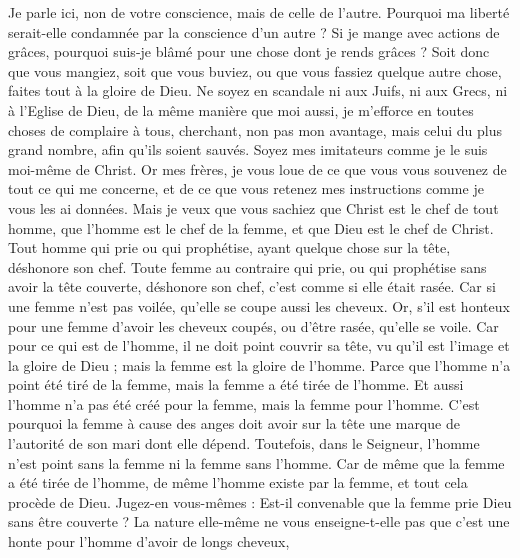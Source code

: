 \begin{multicols}{2}
Je parle ici, non de votre conscience, mais de celle de l'autre. Pourquoi ma liberté serait-elle condamnée par la conscience d'un autre ?
Si je mange avec actions de grâces, pourquoi suis-je blâmé pour une chose dont je rends grâces ?
Soit donc que vous mangiez, soit que vous buviez, ou que vous fassiez quelque autre chose, faites tout à la gloire de Dieu.
Ne soyez en scandale ni aux Juifs, ni aux Grecs, ni à l'Eglise de Dieu,
de la même manière que moi aussi, je m’efforce en toutes choses de complaire à tous, cherchant, non pas mon avantage, mais celui du plus grand nombre, afin qu’ils soient sauvés.
\VerseOne{}Soyez mes imitateurs comme je le suis moi-même de Christ.
Or mes frères, je vous loue de ce que vous vous souvenez de tout ce qui me concerne, et de ce que vous retenez mes instructions comme je vous les ai données.
Mais je veux que vous sachiez que Christ est le chef de tout homme, que l’homme est le chef de la femme, et que Dieu est le chef de Christ.
Tout homme qui prie ou qui prophétise, ayant quelque chose sur la tête, déshonore son chef.
Toute femme au contraire qui prie, ou qui prophétise sans avoir la tête couverte, déshonore son chef, c'est comme si elle était rasée.
Car si une femme n'est pas voilée, qu’elle se coupe aussi les cheveux. Or, s'il est honteux pour une femme d'avoir les cheveux coupés, ou d'être rasée, qu'elle se voile.
Car pour ce qui est de l'homme, il ne doit point couvrir sa tête, vu qu'il est l'image et la gloire de Dieu ; mais la femme est la gloire de l'homme.
Parce que l'homme n'a point été tiré de la femme, mais la femme a été tirée de l'homme.
Et aussi l'homme n'a pas été créé pour la femme, mais la femme pour l'homme.
C'est pourquoi la femme à cause des anges doit avoir sur la tête une marque de l’autorité de son mari dont elle dépend.
Toutefois, dans le Seigneur, l'homme n'est point sans la femme ni la femme sans l'homme.
Car de même que la femme a été tirée de l'homme, de même l'homme existe par la femme, et tout cela procède de Dieu.
Jugez-en vous-mêmes : Est-il convenable que la femme prie Dieu sans être couverte ?
La nature elle-même ne vous enseigne-t-elle pas que c’est une honte pour l'homme d’avoir de longs cheveux,

\end{multicols}
